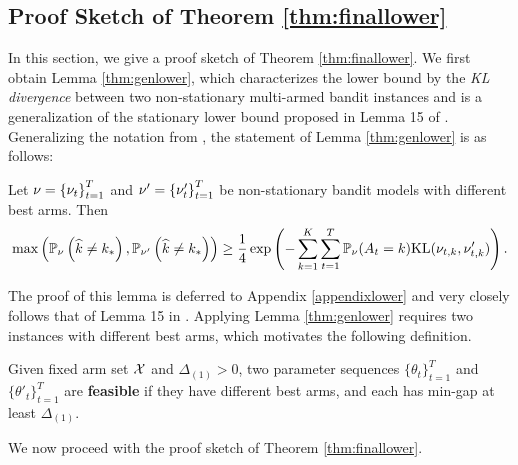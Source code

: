 \subsection{Proof Sketch of Theorem \ref{thm:finallower}}
In this section, we give a proof sketch of Theorem \ref{thm:finallower}. We first obtain Lemma \ref{thm:genlower}, which characterizes the lower bound by the \emph{KL divergence} between two non-stationary multi-armed bandit instances and is a generalization of the stationary lower bound proposed in Lemma 15 of \citet{kaufmann2016complexity}. Generalizing the notation from \citet{kaufmann2016complexity}, the statement of Lemma \ref{thm:genlower} is as follows:
\begin{lemma}
    \label{thm:genlower}
    Let $\nu = \left\{\nu_t\right\}_{t=1}^{T}$ and $\nu' =\left\{\nu'_t\right\}_{t=1}^{T} $ be non-stationary bandit models with different best arms. Then
    \begin{equation}\label{eq:genlower}
    \max\left(\mathbb{P}_{\nu}\left(\widehat{k}\neq k_*\right), \mathbb{P}_{\nu'}\left(\widehat{k}\neq k_*\right)\right) \geq \frac{1}{4} \exp \left(-\sum_{k=1}^K\sum_{t=1}^T\mathbb{P}_{\nu}(A_t=k) \mathrm{KL}(\nu_{t,k}, \nu'_{t,k})\right).
    \end{equation}
\end{lemma}
The proof of this lemma is deferred to Appendix \ref{appendixlower} and very closely follows that of Lemma 15 in \citet{kaufmann2016complexity}. Applying Lemma \ref{thm:genlower} requires two instances with different best arms, which motivates the following definition.
\begin{definition}
    \label{def:feasibility}
    Given fixed arm set $\mathcal{X}$ and $\Delta_{(1)} > 0$, two parameter sequences $\{\theta_t\}_{t=1}^{T}$ and $\{\theta'_t\}_{t=1}^{T}$ are \textbf{feasible} if they have different best arms, and each has min-gap at least $\Delta_{(1)}$.
\end{definition}
We now proceed with the proof sketch of Theorem \ref{thm:finallower}.
